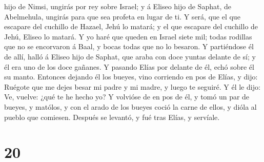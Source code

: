 hijo de Nimsi, ungirás por rey sobre Israel; y á Eliseo hijo de Saphat,
de Abelmehula, ungirás para que sea profeta en lugar de ti.
 Y será, que el que escapare del cuchillo de Hazael, Jehú
lo matará; y el que escapare del cuchillo de Jehú, Eliseo lo matará.
 Y yo haré que queden en Israel siete mil; todas rodillas
que no se encorvaron á Baal, y bocas todas que no lo besaron.
 Y partiéndose él de allí, halló á Eliseo hijo de Saphat,
que araba con doce yuntas delante de sí; y él era uno de los doce
gañanes. Y pasando Elías por delante de él, echó sobre él su manto.
 Entonces dejando él los bueyes, vino corriendo en pos de
Elías, y dijo: Ruégote que me dejes besar mi padre y mi madre, y luego
te seguiré. Y él le dijo: Ve, vuelve: ¿qué te he hecho yo?
 Y volvióse de en pos de él, y tomó un par de bueyes, y
matólos, y con el arado de los bueyes coció la carne de ellos, y dióla
al pueblo que comiesen. Después se levantó, y fué tras Elías, y
servíale.

\hypertarget{section-19}{%
\section{20}\label{section-19}}

